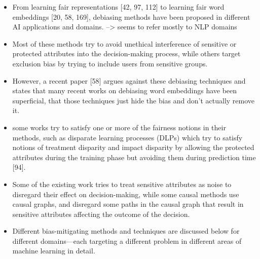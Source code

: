 \documentclass[12pt, a4paper, oneside]{book}   	%
\begin{document}
\begin{itemize}
				
				\item From learning fair representations [42, 97, 112] to learning fair word embeddings [20, 58, 169], debiasing methods have been proposed in different AI applications and domains. \autocite{Mehrabi_2021} --> seems to refer mostly to NLP domains
				\item Most of these methods try to avoid unethical interference of sensitive or protected attributes into the decision-making process, while others target exclusion bias by trying to include users from sensitive groups. \autocite{Mehrabi_2021}
				\item However, a recent paper [58] argues against these debiasing techniques and states that many recent works on debiasing word embeddings have been superficial, that those techniques just hide the bias and don’t actually remove it. \autocite{Mehrabi_2021}
				\item some works try to satisfy one or more of the fairness notions in their methods, such as disparate learning processes (DLPs) which try to satisfy notions of treatment disparity and impact disparity by allowing the protected attributes during the training phase but avoiding them during prediction time [94].\autocite{Mehrabi_2021}
				\item Some of the existing work tries to treat sensitive attributes as noise to disregard their effect on decision-making, while some causal methods use causal graphs, and disregard some paths in the causal graph that result in sensitive attributes affecting the outcome of the decision.\autocite{Mehrabi_2021}
				\item Different bias-mitigating methods and techniques are discussed below for different domains—each targeting a different problem in different areas of machine learning in detail. \autocite{Mehrabi_2021}
			\end{itemize}
			
\end{document}
